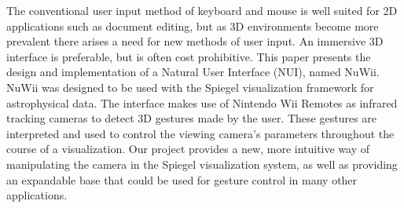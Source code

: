 \fontsize{9}{11}\selectfont
The conventional user input method of keyboard and mouse is well suited for 2D
applications such as document editing, but as 3D environments become more
prevalent there arises a need for new methods of user input. An immersive 3D
interface is preferable, but is often cost prohibitive. This paper presents the
design and implementation of a Natural User Interface (NUI), named NuWii. NuWii
was designed to be used with the Spiegel visualization framework for
astrophysical data. The interface makes use of Nintendo Wii Remotes as infrared
tracking cameras to detect 3D gestures made by the user. These gestures are
interpreted and used to control the viewing camera's parameters throughout the
course of a visualization.  Our project provides a new, more intuitive way of manipulating the camera in the Spiegel visualization system, as well as providing an expandable base that could be used for
gesture control in many other applications.
